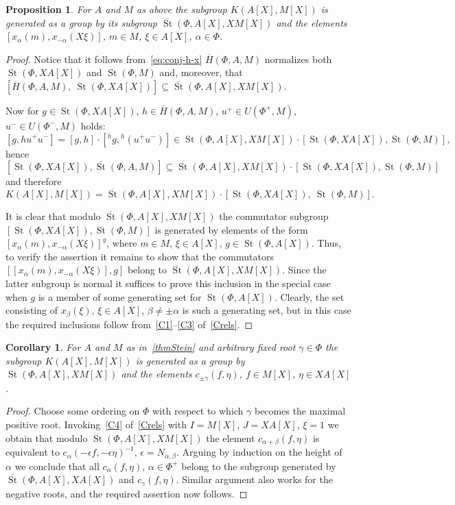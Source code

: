 \documentclass[oneside, 8pt]{amsart}
\newtheorem{prop}{Proposition}
\newtheorem{corollary}{Corollary}
\theoremstyle{remark}
\theoremstyle{definition}
\DeclareMathOperator{\St}{St}
\numberwithin{equation}{section}
\begin{document}
\begin{prop} \label{Kgen}
For $A$ and $M$ as above the subgroup $K(A[X], M[X])$ is generated as a group by its subgroup $\overline{\St}(\Phi, A[X], XM[X])$ and
 the elements $[x_\alpha(m), x_{-\alpha}(X\xi)]$, $m \in M$, $\xi \in A[X]$, $\alpha \in \Phi$. \end{prop}
\begin{proof}
 Notice that it follows from~\eqref{eq:conj-h-x} $\overline{H}(\Phi, A, M)$ normalizes both $\St(\Phi, XA[X])$ and $\St(\Phi, M)$ and, moreover, that $[\overline{H}(\Phi, A, M),\ \St(\Phi, XA[X])] \subseteq \overline{\St}(\Phi, A[X], XM[X])$. 
 
Now for $g \in \St(\Phi, XA[X])$, $h \in \overline{H}(\Phi, A, M)$, $u^+ \in U(\Phi^+, M)$, $u^- \in U(\Phi^-, M)$ holds:
\[ [g, h u^+ u^-] = [g, h] \cdot [{}^{h}\!g, {}^{h}\!(u^+u^-)] \in \St(\Phi, A[X], XM[X]) \cdot [\St(\Phi, XA[X]), \St(\Phi, M)],\]
hence $\left[\St(\Phi, XA[X]), \overline{\St}(\Phi, A, M)\right] \subseteq \overline{\St}(\Phi, A[X], XM[X]) \cdot \left[\St(\Phi, XA[X]), \St(\Phi, M)\right]$ and therefore \[K(A[X], M[X]) = \overline{\St}(\Phi, A[X], XM[X]) \cdot \left[\St(\Phi, XA[X]),\ \St(\Phi, M)\right].\]
 
It is clear that modulo $\overline{\St}(\Phi, A[X], XM[X])$ the commutator subgroup $[\St(\Phi, XA[X]), \St(\Phi, M)]$ is generated by elements of the form $[x_\alpha(m), x_{-\alpha}(X\xi)]^g$, where $m \in M$, $\xi \in A[X]$, $g \in \St(\Phi, A[X])$.
Thus, to verify the assertion it remains to show that the commutators $[[x_\alpha(m), x_{-\alpha}(X\xi)], g]$ belong to $\overline{\St}(\Phi, A[X], XM[X])$.
Since the latter subgroup is normal it suffices to prove this inclusion in the special case when $g$ is a member of some generating set for $\St(\Phi, A[X])$.
Clearly, the set consisting of $x_\beta(\xi)$, $\xi \in A[X]$, $\beta \neq \pm \alpha$ is such a generating set, but in this case the required inclusions follow from~\eqref{C1}--\eqref{C3} of~\cref{Crels}. \end{proof}

\begin{corollary} \label{Kgen-strong}
 For $A$ and $M$ as in~\cref{thmStein} and arbitrary fixed root $\gamma\in \Phi$ the subgroup $K(A[X], M[X])$ is generated as a group by $\St(\Phi, A[X], XM[X])$ and the elements $c_{\pm \gamma}(f, \eta)$, $f \in M[X]$, $\eta \in XA[X]$.
\end{corollary}
\begin{proof}
 Choose some ordering on $\Phi$ with respect to which $\gamma$ becomes the maximal positive root. 
 Invoking~\eqref{C4} of~\cref{Crels} with $I = M[X]$, $J=XA[X]$, $\xi = 1$ we obtain that modulo 
 $\overline{\St}(\Phi, A[X], XM[X])$ the element $c_{\alpha + \beta}(f, \eta)$ is equivalent to 
 $c_{\alpha}(-\epsilon f, -\epsilon \eta)^{-1}$, $\epsilon = N_{\alpha, \beta}$. 
 Arguing by induction on the height of $\alpha$ we conclude that all $c_\alpha(f, \eta)$, $\alpha \in \Phi^+$
 belong to the subgroup generated by $\overline{\St}(\Phi, A[X], XA[X])$ and $c_\gamma(f, \eta)$.
 Similar argument also works for the negative roots, and the required assertion now follows.
\end{proof}
\end{document}

